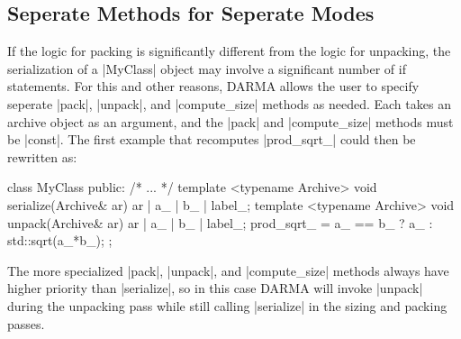 \subsection{Seperate Methods for Seperate Modes}
If the logic for packing is significantly different from the logic for unpacking,
the serialization of a |MyClass| object may involve a significant
number of if statements. For this and other reasons, DARMA allows the user to specify
seperate |pack|, |unpack|, and |compute_size| methods as needed.  Each takes an
archive object as an argument, and the |pack| and |compute_size| methods must
be |const|.  The first example that recomputes |prod_sqrt_| could then be
rewritten as:
\begin{CppCodeNumb}
class MyClass {
  public:
    /* ... */
    template <typename Archive>
    void serialize(Archive& ar) {
      ar | a_ | b_ | label_;
    }
    template <typename Archive>
    void unpack(Archive& ar) {
      ar | a_ | b_ | label_;
      prod_sqrt_ = a_ == b_ ? a_ : std::sqrt(a_*b_);
    }
};
\end{CppCodeNumb}
The more specialized |pack|, |unpack|, and |compute_size| methods always have
higher priority than |serialize|, so in this case DARMA will invoke |unpack|
during the unpacking pass while still calling |serialize| in the sizing and
packing passes.

